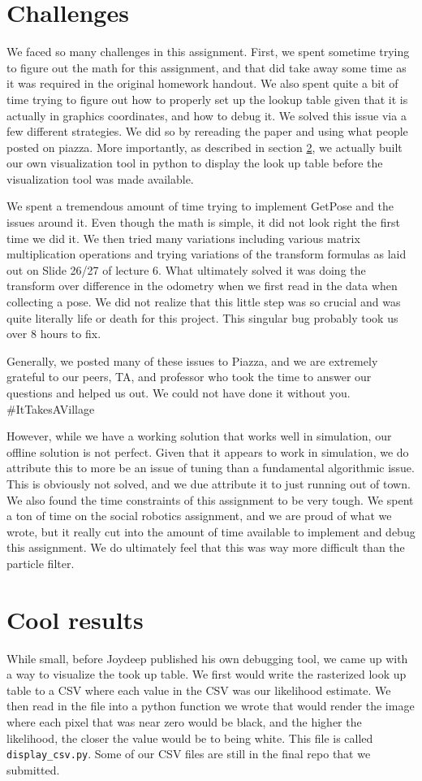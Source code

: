 \documentclass[12pt]{article}
\begin{document}
\section{Challenges}
We faced so many challenges in this assignment. First, we spent sometime trying to figure out the math for this assignment, and that did take away some time as it was required in the original homework handout. We also spent quite a bit of time trying to figure out how to properly set up the lookup table given that it is actually in graphics coordinates, and how to debug it. We solved this issue via a few different strategies. We did so by rereading the paper and using what people posted on piazza. More importantly, as described in section \ref{cool}, we actually built our own visualization tool in python to display the look up table before the visualization tool was made available. 

We spent a tremendous amount of time trying to implement GetPose and the issues around it. Even though the math is simple, it did not look right the first time we did it. We then tried many variations including various matrix multiplication operations and trying variations of the transform formulas as laid out on Slide 26/27 of lecture 6. What ultimately solved it was doing the transform over difference in the odometry when we first read in the data when collecting a pose. We did not realize that this little step was so crucial and was quite literally life or death for this project. This singular bug probably took us over 8 hours to fix. 

Generally, we posted many of these issues to Piazza, and we are extremely grateful to our peers, TA, and professor who took the time to answer our questions and helped us out. We could not have done it without you. \#ItTakesAVillage 

However, while we have a working solution that works well in simulation, our offline solution is not perfect. Given that it appears to work in simulation, we do attribute this to more be an issue of tuning than a fundamental algorithmic issue. This is obviously not solved, and we due attribute it to just running out of town. We also found the time constraints of this assignment to be very tough. We spent a ton of time on the social robotics assignment, and we are proud of what we wrote, but it really cut into the amount of time available to implement and debug this assignment. We do ultimately feel that this was way more difficult than the particle filter. 

\section{Cool results}
\label{cool}
While small, before Joydeep published his own debugging tool, we came up with a way to visualize the took up table. We first would write the rasterized look up table to a CSV where each value in the CSV was our likelihood estimate. We then read in the file into a python function we wrote that would render the image where each pixel that was near zero would be black, and the higher the likelihood, the closer the value would be to being white. This file is called \texttt{display\_csv.py}. Some of our CSV files are still in the final repo that we submitted.  
\end{document}
